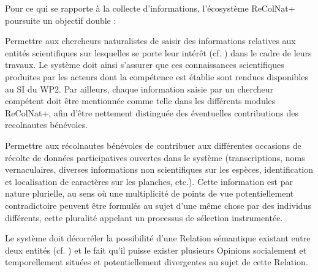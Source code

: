\startchapter[title={Opinions & autorité}]

\startsection[title={Enjeux}]

Pour ce qui se rapporte à la collecte d'informations, l'écosystème ReColNat+ poursuite un objectif double :

\startitemize
	\item
	Permettre aux chercheurs naturalistes de saisir des informations relatives aux entités scientifiques sur lesquelles se porte leur intérêt (cf. ) dans le cadre de leurs travaux.
	Le système doit ainsi s'assurer que ces connaissances scientifiques produites par les acteurs dont la compétence est établie sont rendues disponibles au SI du WP2.
	Par ailleurs, chaque information saisie par un chercheur compétent doit être mentionnée comme telle dans les différents modules ReColNat+, afin d'être nettement distinguée des éventuelles contributions des recolnautes bénévoles.
	\item
	Permettre aux récolnautes bénévoles de contribuer aux différentes occasions de récolte de données participatives ouvertes dans le système (transcriptions, noms vernaculaires, diverses informations non scientifiques sur les espèces, identification et localisation de caractères sur les planches, etc.).
	Cette information est par nature plurielle, au sens où une multiplicité de points de vue potentiellement contradictoire peuvent être formulés au sujet d'une même chose par des individus différents, cette pluralité appelant un processus de sélection instrumentée.
\stopitemize

\startsection[title={Représentation de la contribution}]

\startsubsection[title={Notions de Relation et d'Opinion},reference=s:relopi]

\fon{} Le système doit décorréler la possibilité d'une Relation sémantique existant entre deux entités (cf. ) et le fait qu'il puisse exister plusieurs Opinions socialement et temporellement situées et potentiellement divergentes au sujet de cette Relation.

